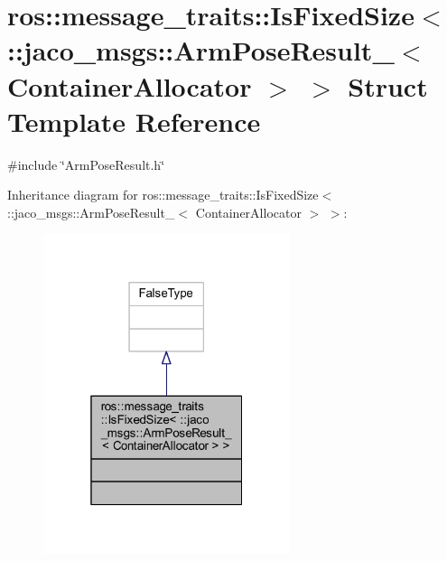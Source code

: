\hypertarget{structros_1_1message__traits_1_1IsFixedSize_3_01_1_1jaco__msgs_1_1ArmPoseResult___3_01ContainerAllocator_01_4_01_4}{}\section{ros\+:\+:message\+\_\+traits\+:\+:Is\+Fixed\+Size$<$ \+:\+:jaco\+\_\+msgs\+:\+:Arm\+Pose\+Result\+\_\+$<$ Container\+Allocator $>$ $>$ Struct Template Reference}
\label{structros_1_1message__traits_1_1IsFixedSize_3_01_1_1jaco__msgs_1_1ArmPoseResult___3_01ContainerAllocator_01_4_01_4}


{\ttfamily \#include \char`\"{}Arm\+Pose\+Result.\+h\char`\"{}}



Inheritance diagram for ros\+:\+:message\+\_\+traits\+:\+:Is\+Fixed\+Size$<$ \+:\+:jaco\+\_\+msgs\+:\+:Arm\+Pose\+Result\+\_\+$<$ Container\+Allocator $>$ $>$\+:
\nopagebreak
\begin{figure}[H]
\begin{center}
\leavevmode
\includegraphics[width=205pt]{d7/daa/structros_1_1message__traits_1_1IsFixedSize_3_01_1_1jaco__msgs_1_1ArmPoseResult___3_01ContainerA6fb0c0f092e516e7adb34f32694d1c04}
\end{center}
\end{figure}


